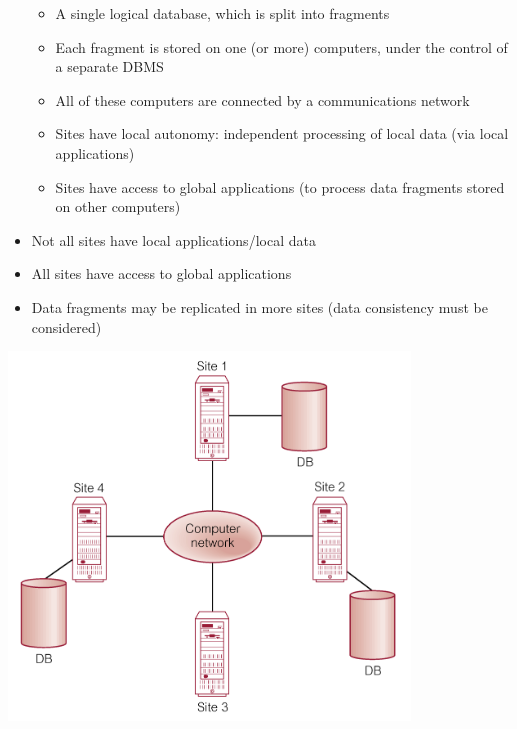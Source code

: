 \documentclass{article}[18pt]
\begin{document}
\begin{itemize}
\begin{itemize}
		\item A single logical database, which is split into fragments
		\item Each fragment is stored on one (or more) computers, under the control of a separate DBMS
		\item All of these computers are connected by a communications network
		\item Sites have local autonomy: independent processing of local data (via local applications)
		\item Sites have access to global applications (to process data fragments stored on other computers)
	\end{itemize}
	\item Not all sites have local applications/local data
	\item All sites have access to global applications
	\item Data fragments may be replicated in more sites (data consistency must be considered)
\end{itemize}
\begin{center}
	\includegraphics[scale=0.7]{Distributed}
\end{center}
\end{document}
